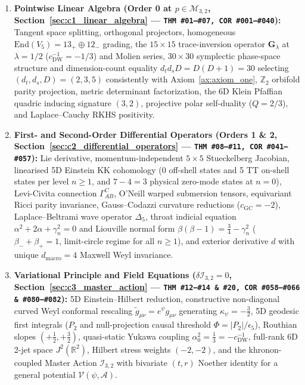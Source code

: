 \documentclass[11pt,a4paper]{article}
\theoremstyle{definition}
\theoremstyle{plain}
\theoremstyle{remark}
\begin{document}
\begin{enumerate}[label=\textbf{Stage \arabic*.}, leftmargin=2.2cm]
  \item \textbf{Pointwise Linear Algebra (Order 0 at $p \in \mathcal{M}_{3,2}$, Section~\ref{sec:c1_linear_algebra} --- \texttt{THM~\#01--\#07, COR~\#001--\#040}):} Tangent space splitting, orthogonal projectors, homogeneous $\mathrm{End}(V_5) = 13_+ \oplus 12_-$ grading, the $15\times 15$ trace-inversion operator $\mathbf{G}_\lambda$ at $\lambda = 1/2$ ($c_{\mathrm{DW}}^{-1}=-1/3$) and Molien series, $30\times 30$ symplectic phase-space structure and dimension-count equality $d_t d_s D = D(D+1) = 30$ selecting $(d_t, d_s, D) = (2, 3, 5)$ consistently with Axiom~\ref{ax:axiom_one}, $\mathbb{Z}_2$ orbifold parity projection, metric determinant factorization, the 6D Klein Pfaffian quadric inducing signature $(3,2)$, projective polar self-duality ($Q=2/3$), and Laplace--Cauchy RKHS positivity.
  \item \textbf{First- and Second-Order Differential Operators (Orders 1 \& 2, Section~\ref{sec:c2_differential_operators} --- \texttt{THM~\#08--\#11, COR~\#041--\#057}):} Lie derivative, momentum-independent $5\times 5$ Stueckelberg Jacobian, linearised 5D Einstein KK cohomology (0 off-shell states and 5 TT on-shell states per level $n \ge 1$, and $7 - 4 = 3$ physical zero-mode states at $n = 0$), Levi-Civita connection $\Gamma^C_{AB}$, O'Neill warped submersion tensors, equivariant Ricci parity invariance, Gauss--Codazzi curvature reductions ($c_{\mathrm{GC}}=-2$), Laplace--Beltrami wave operator $\Delta_5$, throat indicial equation $\alpha^2 + 2\alpha + \gamma_n^2 = 0$ and Liouville normal form $\beta(\beta - 1) = \frac{3}{4} - \gamma_n^2$ ($\beta_- + \beta_+ = 1$, limit-circle regime for all $n \ge 1$), and exterior derivative $d$ with unique $d_{\mathrm{macro}}=4$ Maxwell Weyl invariance.
  \item \textbf{Variational Principle and Field Equations ($\delta\mathcal{I}_{3,2} = 0$, Section~\ref{sec:c3_master_action} --- \texttt{THM~\#12--\#14 \& \#20, COR~\#058--\#066 \& \#080--\#082}):} 5D Einstein--Hilbert reduction, constructive non-diagonal curved Weyl conformal rescaling $\tilde{g}_{\mu\nu} = e^\psi g_{\mu\nu}$ generating $\kappa_\psi = -\frac{3}{2}$, 5D geodesic first integrals ($P_2$ and null-projection causal threshold $\Phi = |P_2|/\epsilon_5$), Routhian slopes $(+\frac{1}{2}, +\frac{3}{2})$, quasi-static Yukawa coupling $\alpha_0^2 = \frac{1}{3} = -c_{\mathrm{DW}}^{-1}$, full-rank 6D 2-jet space $J^2(\mathbb{R}^2)$, Hilbert stress weights $(-2,-2)$, and the khronon-coupled Master Action $\mathcal{I}_{3,2}$ with bivariate $(t,r)$ Noether identity for a general potential $\mathcal{V}(\psi,\mathcal{A})$.

\end{enumerate}
\end{document}
